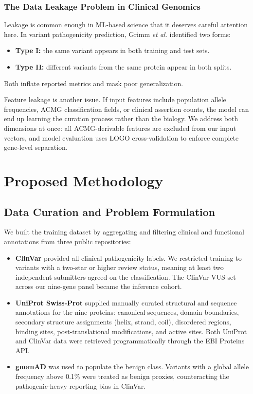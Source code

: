 \documentclass[conference]{IEEEtran}
\begin{document}
\subsubsection{The Data Leakage Problem in Clinical Genomics}
Leakage is common enough in ML-based science \cite{kapoor2023leakage} that it deserves careful attention here. In variant pathogenicity prediction, Grimm \textit{et al.} \cite{grimm2015circularity} identified two forms:
\begin{itemize}
    \item \textbf{Type I:} the same variant appears in both training and test sets.
    \item \textbf{Type II:} different variants from the same protein appear in both splits.
\end{itemize}
Both inflate reported metrics and mask poor generalization.

Feature leakage is another issue. If input features include population allele frequencies, ACMG classification fields, or clinical assertion counts, the model can end up learning the curation process rather than the biology. We address both dimensions at once: all ACMG-derivable features are excluded from our input vectors, and model evaluation uses LOGO cross-validation to enforce complete gene-level separation.

\section{Proposed Methodology}
\label{sec:methodology}


\subsection{Data Curation and Problem Formulation}
\label{sec:data}

We built the training dataset by aggregating and filtering clinical and functional annotations from three public repositories:
\begin{itemize}
    \item \textbf{ClinVar} provided all clinical pathogenicity labels. We restricted training to variants with a two-star or higher review status, meaning at least two independent submitters agreed on the classification. The ClinVar VUS set across our nine-gene panel became the inference cohort.
    \item \textbf{UniProt Swiss-Prot} supplied manually curated structural and sequence annotations for the nine proteins: canonical sequences, domain boundaries, secondary structure assignments (helix, strand, coil), disordered regions, binding sites, post-translational modifications, and active sites. Both UniProt and ClinVar data were retrieved programmatically through the EBI Proteins API.
    \item \textbf{gnomAD} was used to populate the benign class. Variants with a global allele frequency above 0.1\% were treated as benign proxies, counteracting the pathogenic-heavy reporting bias in ClinVar.
\end{itemize}
\end{document}
